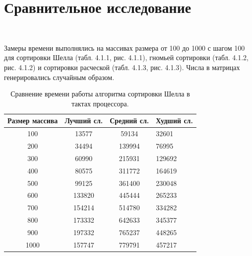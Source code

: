 \documentclass[12pt]{report}
\begin{document}
	\section{Сравнительное исследование}
	
	~\
	
	Замеры времени выполнялись на массивах размера от 100 до 1000 с
	шагом 100 для сортировки Шелла (табл. 4.1.1, рис. 4.1.1), гномьей сортировки (табл. 4.1.2, рис. 4.1.2) и сортировки расческой (табл. 4.1.3, рис.
	4.1.3). Числа в матрицах генерировались случайным образом.
	
	\newpage
	
	\begin{table}[h]
		\caption{\label{tab:time1} Сравнение времени работы алгоритма сортировки Шелла в тактах процессора. }
		\begin{center}
			\begin{tabular}{|c|c|c|p{3.8cm}|}
				\hline
				Размер массива & Лучший сл.& Средний сл. & Худший сл. \\ [0.5ex] 
				\hline
				100 & 13577 & 59134 & 32601\\
				\hline
				200 & 34494 & 139994 & 76995\\
				\hline
				300 & 60990 & 215931 & 129692\\
				\hline
				400 & 80575 & 311772 & 164619\\
				\hline
				500 & 99125 & 361400 & 230048\\
				\hline
				600 & 133820 & 445444 & 265233\\
				\hline
				700 & 154214 & 514780 & 334282\\
				\hline
				800 & 173332 & 642633 & 345377\\
				\hline
				900 & 197332 & 765237 & 448265\\
				\hline
				1000 & 157747 & 779791 & 457217\\
				\hline
			\end{tabular}
		\end{center}
	\end{table}
	
	
	
\end{document}

